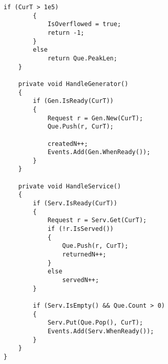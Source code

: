 \begin{lstlisting}[caption = {Реализация модели}, label=lst:prog]
		if (CurT > 1e5)
		{
			IsOverflowed = true;
			return -1;
		}
		else
			return Que.PeakLen;
	}
	
	private void HandleGenerator()
	{
		if (Gen.IsReady(CurT))
		{
			Request r = Gen.New(CurT);
			Que.Push(r, CurT);
			
			createdN++;
			Events.Add(Gen.WhenReady());
		}
	}
	
	private void HandleService()
	{
		if (Serv.IsReady(CurT))
		{
			Request r = Serv.Get(CurT);
			if (!r.IsServed())
			{
				Que.Push(r, CurT);
				returnedN++;
			}
			else
				servedN++;
		}
		
		if (Serv.IsEmpty() && Que.Count > 0)
		{
			Serv.Put(Que.Pop(), CurT);
			Events.Add(Serv.WhenReady());
		}
	}
}
\end{lstlisting}
